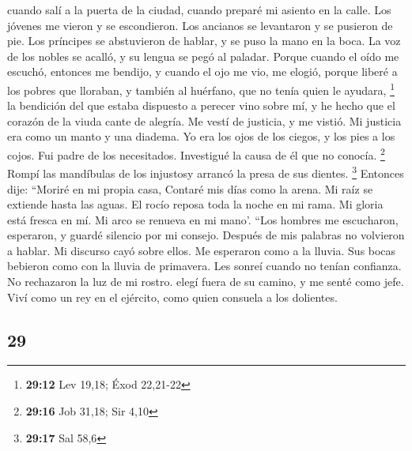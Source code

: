 \begin{paracol}{2}
 cuando salí a la puerta de la ciudad, cuando preparé mi
asiento en la calle.  Los jóvenes me vieron y se
escondieron. Los ancianos se levantaron y se pusieron de pie.
 Los príncipes se abstuvieron de hablar, y se puso la mano
en la boca.  La voz de los nobles se acalló, y su lengua
se pegó al paladar.  Porque cuando el oído me escuchó,
entonces me bendijo, y cuando el ojo me vio, me elogió, 
porque liberé a los pobres que lloraban, y también al huérfano, que no
tenía quien le ayudara, \footnote{\textbf{29:12} Lev 19,18; Éxod
  22,21-22}  la bendición del que estaba dispuesto a
perecer vino sobre mí, y he hecho que el corazón de la viuda cante de
alegría.  Me vestí de justicia, y me vistió. Mi justicia
era como un manto y una diadema.  Yo era los ojos de los
ciegos, y los pies a los cojos.  Fui padre de los
necesitados. Investigué la causa de él que no conocía. \footnote{\textbf{29:16}
  Job 31,18; Sir 4,10}  Rompí las mandíbulas de los
injustosy arrancó la presa de sus dientes. \footnote{\textbf{29:17} Sal
  58,6}  Entonces dije: ``Moriré en mi propia casa,
Contaré mis días como la arena.  Mi raíz se extiende
hasta las aguas. El rocío reposa toda la noche en mi rama.
 Mi gloria está fresca en mí. Mi arco se renueva en mi
mano'.  ``Los hombres me escucharon, esperaron, y guardé
silencio por mi consejo.  Después de mis palabras no
volvieron a hablar. Mi discurso cayó sobre ellos.  Me
esperaron como a la lluvia. Sus bocas bebieron como con la lluvia de
primavera.  Les sonreí cuando no tenían confianza. No
rechazaron la luz de mi rostro.  elegí fuera de su
camino, y me senté como jefe. Viví como un rey en el ejército, como
quien consuela a los dolientes.

\switchcolumn
\begin{otherlanguage}{english}

\hypertarget{section-57}{%
\section{29}\label{section-57}}


\end{otherlanguage}
\end{paracol}
